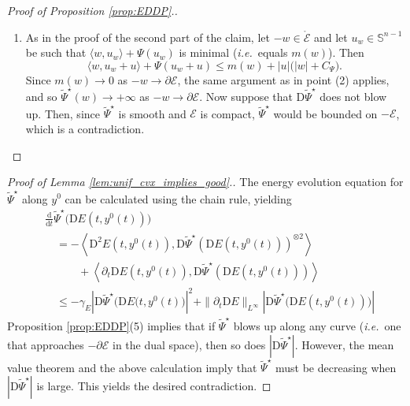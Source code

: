 \documentclass[reqno]{amsart}
\theoremstyle{definition}
\begin{document}
\begin{proof}[Proof of Proposition \ref{prop:EDDP}.]
\begin{enumerate}
		\item As in the proof of the second part of the claim, let $- w \in \mathring{\mathcal{E}}$ and let $u_{w} \in \mathbb{S}^{n - 1}$ be such that $\langle w, u_{w} \rangle + \Psi(u_{w})$ is minimal (\emph{i.e.}\ equals $m(w)$).  Then
		\[
			\langle w, u_{w} + u \rangle + \Psi(u_{w} + u) \leq m(w) + | u | \big( | w | + C_{\Psi} \big).
		\]
		Since $m(w) \to 0$ as $-w \to \partial {\mathcal{E}}$, the same argument as in point (2) applies, and so ${\widetilde{\Psi}}^{\star}(w) \to + \infty$ as $-w \to \partial {\mathcal{E}}$.  Now suppose that ${\mathrm{D}} {\widetilde{\Psi}}^{\star}$ does not blow up.  Then, since ${\widetilde{\Psi}}^{\star}$ is smooth and ${\mathcal{E}}$ is compact, ${\widetilde{\Psi}}^{\star}$ would be bounded on $-{\mathcal{E}}$, which is a contradiction. 	\qedhere
	\end{enumerate}
\end{proof}

\begin{proof}[Proof of Lemma \ref{lem:unif_cvx_implies_good}.]
	The energy evolution equation for ${\widetilde{\Psi}}^{\star}$ along $y^{0}$ can be calculated using the chain rule, yielding
	\begin{align*}
		& \frac{\mathrm{d}}{{\mathrm{d}} t} {\widetilde{\Psi}}^{\star} \big( {\mathrm{D}} E(t, y^{0}(t)) \big) \\
		& \quad = - \left\langle {\mathrm{D}}^{2} E(t, y^{0}(t)) , {\mathrm{D}} {\widetilde{\Psi}}^{\star} ( {\mathrm{D}} E(t, y^{0}(t)) )^{\otimes 2} \right\rangle \\
		& \quad \quad \quad + \left\langle \partial_{t} {\mathrm{D}} E(t, y^{0}(t)), {\mathrm{D}} {\widetilde{\Psi}}^{\star}({\mathrm{D}} E(t, y^{0}(t))) \right\rangle \\
		& \quad \leq - \gamma_{E} \left| {\mathrm{D}} {\widetilde{\Psi}}^{\star} \big( {\mathrm{D}} E(t, y^{0}(t) \big) \right|^{2} + \| \partial_{t} {\mathrm{D}} E \|_{L^{\infty}} \left| {\mathrm{D}} {\widetilde{\Psi}}^{\star} \big( {\mathrm{D}} E(t, y^{0}(t)) \big) \right|
	\end{align*}
	Proposition \ref{prop:EDDP}(5) implies that if ${\widetilde{\Psi}}^{\star}$ blows up along any curve (\emph{i.e.}\ one that approaches $- \partial {\mathcal{E}}$ in the dual space), then so does $| {\mathrm{D}} {\widetilde{\Psi}}^{\star} |$.  However, the mean value theorem and the above calculation imply that ${\widetilde{\Psi}}^{\star}$ must be decreasing when $| {\mathrm{D}} {\widetilde{\Psi}}^{\star} |$ is large.  This yields the desired contradiction.
\end{proof}
\end{document}
